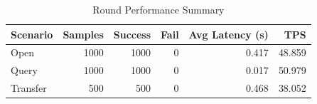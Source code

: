 \begin{table}
\caption{Round Performance Summary}
\label{tab:round_perf}
\begin{tabular}{lrrrrr}
\toprule
Scenario & Samples & Success & Fail & Avg Latency (s) & TPS \\
\midrule
Open & 1000 & 1000 & 0 & 0.417 & 48.859 \\
Query & 1000 & 1000 & 0 & 0.017 & 50.979 \\
Transfer & 500 & 500 & 0 & 0.468 & 38.052 \\
\bottomrule
\end{tabular}
\end{table}
